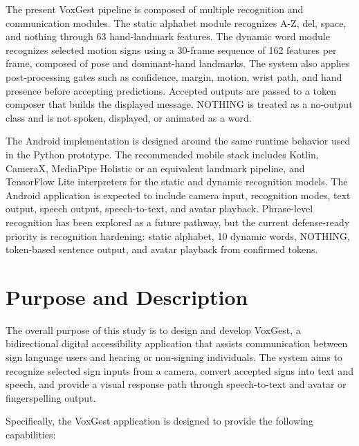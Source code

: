 The present VoxGest pipeline is composed of multiple recognition and communication modules. The static alphabet module recognizes A-Z, del, space, and nothing through 63 hand-landmark features. The dynamic word module recognizes selected motion signs using a 30-frame sequence of 162 features per frame, composed of pose and dominant-hand landmarks. The system also applies post-processing gates such as confidence, margin, motion, wrist path, and hand presence before accepting predictions. Accepted outputs are passed to a token composer that builds the displayed message. NOTHING is treated as a no-output class and is not spoken, displayed, or animated as a word.

The Android implementation is designed around the same runtime behavior used in the Python prototype. The recommended mobile stack includes Kotlin, CameraX, MediaPipe Holistic or an equivalent landmark pipeline, and TensorFlow Lite interpreters for the static and dynamic recognition models. The Android application is expected to include camera input, recognition modes, text output, speech output, speech-to-text, and avatar playback. Phrase-level recognition has been explored as a future pathway, but the current defense-ready priority is recognition hardening: static alphabet, 10 dynamic words, NOTHING, token-based sentence output, and avatar playback from confirmed tokens.

\section{Purpose and Description}

The overall purpose of this study is to design and develop VoxGest, a bidirectional digital accessibility application that assists communication between sign language users and hearing or non-signing individuals. The system aims to recognize selected sign inputs from a camera, convert accepted signs into text and speech, and provide a visual response path through speech-to-text and avatar or fingerspelling output.

Specifically, the VoxGest application is designed to provide the following capabilities:

